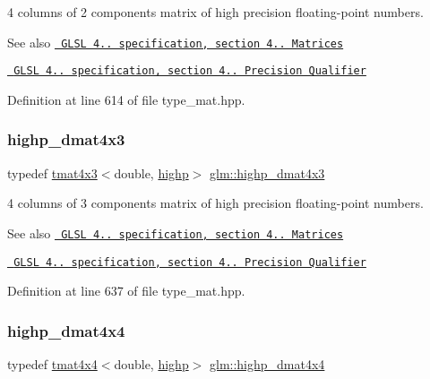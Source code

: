 4 columns of 2 components matrix of high precision floating-\/point numbers.

\begin{DoxySeeAlso}{See also}
\href{http://www.opengl.org/registry/doc/GLSLangSpec.4.20.8.pdf}{\texttt{ G\+L\+SL 4.. specification, section 4.. Matrices}} 

\href{http://www.opengl.org/registry/doc/GLSLangSpec.4.20.8.pdf}{\texttt{ G\+L\+SL 4.. specification, section 4.. Precision Qualifier}} 
\end{DoxySeeAlso}


Definition at line 614 of file type\+\_\+mat.\+hpp.

\mbox{\label{group__core__precision_gaec00d802f271a807485a0069cdb5ea05}} 
\subsubsection{\texorpdfstring{highp\_dmat4x3}{highp\_dmat4x3}}
{\footnotesize\ttfamily typedef \mbox{\hyperlink{structglm_1_1tmat4x3}{tmat4x3}}$<$double, \mbox{\hyperlink{namespaceglm_a0f04f086094c747d227af4425893f545ac6f7eab42eacbb10d59a58e95e362074}{highp}}$>$ \mbox{\hyperlink{group__core__precision_gaec00d802f271a807485a0069cdb5ea05}{glm\+::highp\+\_\+dmat4x3}}}

4 columns of 3 components matrix of high precision floating-\/point numbers.

\begin{DoxySeeAlso}{See also}
\href{http://www.opengl.org/registry/doc/GLSLangSpec.4.20.8.pdf}{\texttt{ G\+L\+SL 4.. specification, section 4.. Matrices}} 

\href{http://www.opengl.org/registry/doc/GLSLangSpec.4.20.8.pdf}{\texttt{ G\+L\+SL 4.. specification, section 4.. Precision Qualifier}} 
\end{DoxySeeAlso}


Definition at line 637 of file type\+\_\+mat.\+hpp.

\mbox{\label{group__core__precision_ga46855bd8fdcb8dbc7db5d2aaeb91be69}} 
\subsubsection{\texorpdfstring{highp\_dmat4x4}{highp\_dmat4x4}}
{\footnotesize\ttfamily typedef \mbox{\hyperlink{structglm_1_1tmat4x4}{tmat4x4}}$<$double, \mbox{\hyperlink{namespaceglm_a0f04f086094c747d227af4425893f545ac6f7eab42eacbb10d59a58e95e362074}{highp}}$>$ \mbox{\hyperlink{group__core__precision_ga46855bd8fdcb8dbc7db5d2aaeb91be69}{glm\+::highp\+\_\+dmat4x4}}}

